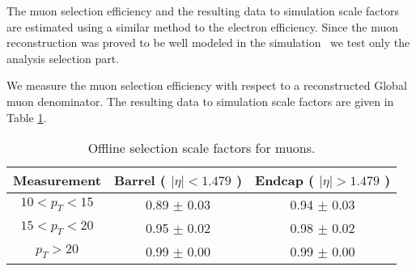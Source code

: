 
The muon selection efficiency and the resulting data to simulation
scale factors are estimated using a similar method to the electron efficiency.
Since the muon reconstruction was proved to be well modeled in the simulation~\cite{VBTFCrossSectionNote}
we test only the analysis selection part.

We measure the muon selection efficiency with respect to a reconstructed Global muon
denominator.
The resulting data to simulation scale factors are given in Table \ref{tab:eff_mu_offline}.

\begin{table}[!ht]
\begin{center}
\begin{tabular}{c|c|c}
\hline
Measurement & Barrel ( $|\eta|<1.479$ )   & Endcap ( $|\eta|>1.479$ )  \\ 
\hline
$  10<p_T<  15$ & 0.89 $\pm$ 0.03  & 0.94 $\pm$ 0.03  \\ \hline 
$  15<p_T<  20$ & 0.95 $\pm$ 0.02  & 0.98 $\pm$ 0.02  \\ \hline 
$    p_T>   20$ & 0.99 $\pm$ 0.00  & 0.99 $\pm$ 0.00  \\ \hline 
\end{tabular}
\caption{Offline selection scale factors for muons.}
\label{tab:eff_mu_offline}
\end{center}
\end{table}

